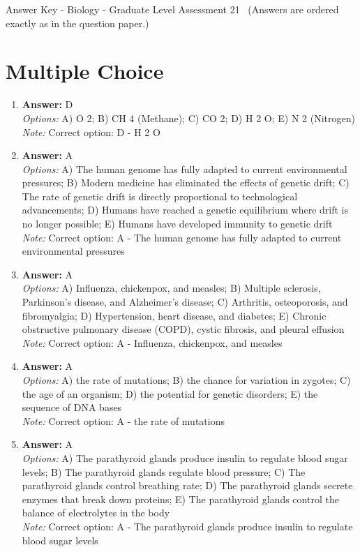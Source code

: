 \documentclass[12pt]{article}
\begin{document}
\begin{center}
Answer Key - Biology - Graduate Level Assessment 21 \
\small (Answers are ordered exactly as in the question paper.)
\end{center}

\section*{Multiple Choice}
\begin{enumerate}[label=\arabic*.]
\item \textbf{Answer:} D
\\ \textit{Options:} A) O 2; B) CH 4 (Methane); C) CO 2; D) H 2 O; E) N 2 (Nitrogen)
\\ \textit{Note:} Correct option: D - H 2 O
\item \textbf{Answer:} A
\\ \textit{Options:} A) The human genome has fully adapted to current environmental pressures; B) Modern medicine has eliminated the effects of genetic drift; C) The rate of genetic drift is directly proportional to technological advancements; D) Humans have reached a genetic equilibrium where drift is no longer possible; E) Humans have developed immunity to genetic drift
\\ \textit{Note:} Correct option: A - The human genome has fully adapted to current environmental pressures
\item \textbf{Answer:} A
\\ \textit{Options:} A) Influenza, chickenpox, and measles; B) Multiple sclerosis, Parkinson's disease, and Alzheimer's disease; C) Arthritis, osteoporosis, and fibromyalgia; D) Hypertension, heart disease, and diabetes; E) Chronic obstructive pulmonary disease (COPD), cystic fibrosis, and pleural effusion
\\ \textit{Note:} Correct option: A - Influenza, chickenpox, and measles
\item \textbf{Answer:} A
\\ \textit{Options:} A) the rate of mutations; B) the chance for variation in zygotes; C) the age of an organism; D) the potential for genetic disorders; E) the sequence of DNA bases
\\ \textit{Note:} Correct option: A - the rate of mutations
\item \textbf{Answer:} A
\\ \textit{Options:} A) The parathyroid glands produce insulin to regulate blood sugar levels; B) The parathyroid glands regulate blood pressure; C) The parathyroid glands control breathing rate; D) The parathyroid glands secrete enzymes that break down proteins; E) The parathyroid glands control the balance of electrolytes in the body
\\ \textit{Note:} Correct option: A - The parathyroid glands produce insulin to regulate blood sugar levels
\end{enumerate}
\end{document}
